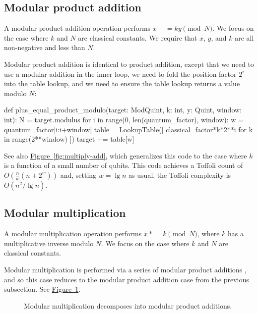 \documentclass[onecolumn,unpublished]{quantumarticle}
\theoremstyle{definition}
\theoremstyle{definition}
\theoremstyle{definition}
\newcommand{\fig}[1]{\hyperref[fig:#1]{Figure~\ref*{fig:#1}}}
\newcommand{\pluseq}{\mathrel{+}=}
\newcommand{\timeseq}{\mathrel{\ast}=}
\begin{document}
\subsection{Modular product addition}

A modular product addition operation performs $x \pluseq k y \pmod{N}$.
We focus on the case where $k$ and $N$ are classical constants.
We require that $x$, $y$, and $k$ are all non-negative and less than $N$.

Modular product addition is identical to product addition, except that we need to use a modular addition in the inner loop, we need to fold the position factor $2^i$ into the table lookup, and we need to ensure the table lookup returns a value modulo $N$:

\begin{python}
    def plus_equal_product_modulo(target: ModQuint,
                                  k: int,
                                  y: Quint,
                                  window: int):
        N = target.modulus
        for i in range(0, len(quantum_factor), window):
            w = quantum_factor[i:i+window]
            table = LookupTable([
                classical_factor*k*2**i %
                for k in range(2**window)
            ])
            target += table[w]
\end{python}

See also \fig{multiply-add}, which generalizes this code to the case where $k$ is a function of a small number of qubits.
This code achieves a Toffoli count of $O(\frac{n}{w} (n + 2^w))$ and, setting $w=\lg n$ as usual, the Toffoli complexity is $O(n^2/\lg n)$.


\subsection{Modular multiplication}

A modular multiplication operation performs $x \timeseq k \pmod{N}$, where $k$ has a multiplicative inverse modulo $N$.
We focus on the case where $k$ and $N$ are classical constants.

Modular multiplication is performed via a series of modular product additions \cite{zalka2006pure, haner2016factoring, gidney2017factoring}, and so this case reduces to the modular product addition case from the previous subsection.
See \fig{multiply}.

\begin{figure}
\centering
{}
    \caption{
        \label{fig:multiply}
        Modular multiplication decomposes into modular product additions.
    }
\end{figure}
\end{document}
